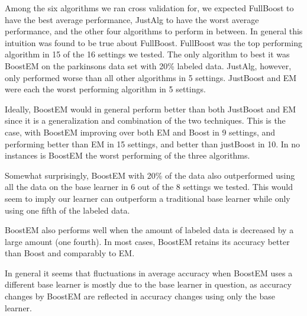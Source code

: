 \documentclass{sig-alternate}
\begin{document}
 Among the six algorithms we ran cross validation for, we expected FullBoost to have the best average performance, JustAlg to
have the worst average performance, and the other four algorithms to perform in between. In general this intuition was found to be true about FullBoost.
FullBoost was the top performing algorithm in 15 of the 16 settings we tested.
The only algorithm to best it was BoostEM on the parkinsons data set
with 20\% labeled data. JustAlg, however, only performed worse than all other algorithms in 5 settings. JustBoost and EM were each the worst performing algorithm
in 5 settings.

Ideally, BoostEM would in general perform better than both JustBoost and EM since it is a generalization and combination of the two techniques. This is the case, 
with BoostEM improving over both EM and Boost in 9 settings, and performing better than EM in 15 settings, and better than justBoost in 10. In no instances is BoostEM 
the worst performing of the three algorithms.

Somewhat surprisingly, BoostEM with 20\% of the data also outperformed using all the data on the base learner in 6 out of the 8 settings we tested.  This would seem to imply our learner can outperform a traditional base learner while only using one fifth of the labeled data.

BoostEM also performs well when the amount of labeled data is decreased by a large amount (one fourth).  In most cases, BoostEM retains its accuracy better than Boost and comparably to EM.

In general it seems that fluctuations in average accuracy when BoostEM uses a different base learner is mostly due to the base learner in question, as accuracy changes by BoostEM are reflected in accuracy changes using only the base learner.
\end{document}
